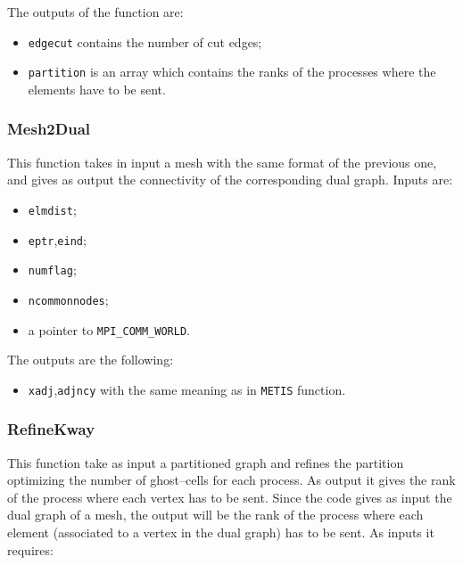 The outputs of the function are:

\begin{itemize}
\item \verb|edgecut| contains the number of cut edges;
\item \verb|partition| is an array which contains the ranks of the processes where the elements have to be sent.
\end{itemize}

\subsubsection{Mesh2Dual}\label{subsubsection:mesh2dual}
This function takes in input a mesh with the same format of the previous one, and gives as output the connectivity of the corresponding dual graph. Inputs are:

\begin{itemize}
\item \verb|elmdist|;
\item \verb|eptr|,\verb|eind|;
\item \verb|numflag|;
\item \verb|ncommonnodes|;
\item a pointer to \verb|MPI_COMM_WORLD|.
\end{itemize}

The outputs are the following:

\begin{itemize}
\item \verb|xadj|,\verb|adjncy| with the same meaning as in \verb|METIS| function.
\end{itemize}

\subsubsection{RefineKway}\label{subsubsection:refinekway}
This function take as input a partitioned graph and refines the partition optimizing the number of ghost--cells for each process. As output it gives the rank of the process where each vertex has to be sent. Since the code gives as input the dual graph of a mesh, the output will be the rank of the process where each element (associated to a vertex in the dual graph) has to be sent. As inputs it requires:

